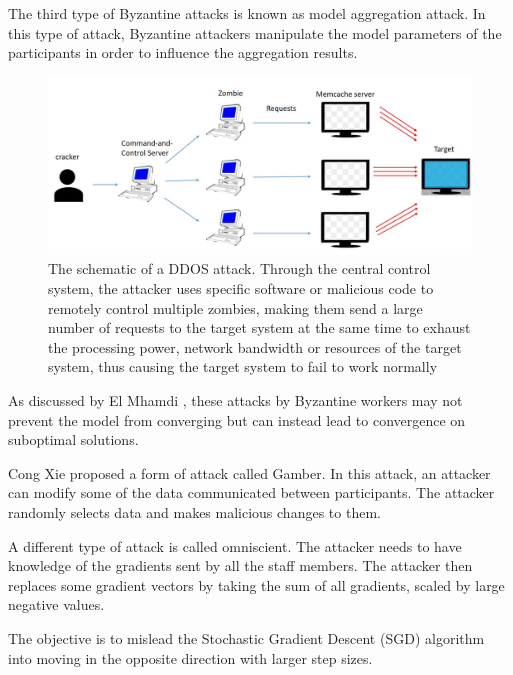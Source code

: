 \documentclass[conference]{IEEEtran}
\begin{document}
  The third type of Byzantine attacks is known as model aggregation attack. In this type of attack, 
  Byzantine attackers manipulate the model parameters of the participants in order to influence the 
  aggregation results. 
  
\begin{figure}[htbp]
    \centerline{\includegraphics[width=0.8\linewidth,height=0.6\linewidth]{picture/ddos.jpg}}
    \caption{The schematic of a DDOS attack. Through the central control system, the attacker uses specific software or malicious code to remotely control multiple zombies, making them send a large number of requests to the target system at the same time to exhaust the processing power, network bandwidth or resources of the target system, thus causing the target system to fail to work normally}
    \label{fig13}
\end{figure}

As discussed by El Mhamdi \cite{b120}, these attacks by Byzantine workers may not 
prevent the model from converging but can instead lead to convergence on suboptimal solutions. 

Cong Xie \cite{b121} proposed a form of attack called Gamber. In this attack, an attacker can modify 
some of the data communicated between participants. The attacker randomly selects data and makes 
malicious changes to them. 

A different type of attack is called omniscient.
The attacker needs to have knowledge of the gradients sent by all the staff members.
The attacker then replaces some gradient vectors by taking the sum of all gradients, scaled by 
large negative values.

The objective is to mislead the Stochastic Gradient Descent (SGD) algorithm into moving in the opposite direction with larger step sizes.
\end{document}
